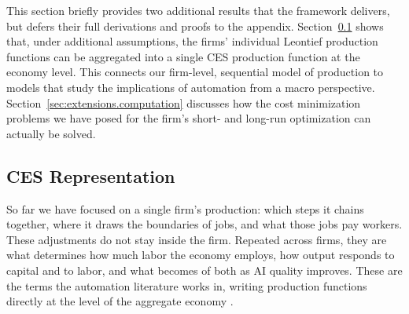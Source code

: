 This section briefly provides two additional results that the framework delivers, but defers their full derivations and proofs to the appendix.
Section~\ref{sec:extensions.aggregation} shows that, under additional assumptions, the firms' individual Leontief production functions can be aggregated into a single CES production function at the economy level.
This connects our firm-level, sequential model of production to models that study the implications of automation from a macro perspective.
Section~\ref{sec:extensions.computation} discusses how the cost minimization problems we have posed for the firm's short- and long-run optimization can actually be solved.


\subsection{CES Representation}
\label{sec:extensions.aggregation}

So far we have focused on a single firm's production: which steps it chains together, where it draws the boundaries of jobs, and what those jobs pay workers.
These adjustments do not stay inside the firm.
Repeated across firms, they are what determines how much labor the economy employs, how output responds to capital and to labor, and what becomes of both as AI quality improves.
These are the terms the automation literature works in, writing production functions directly at the level of the aggregate economy \citep{acemoglu2018, acemoglu2022tasks, acemoglu2025simple}.

